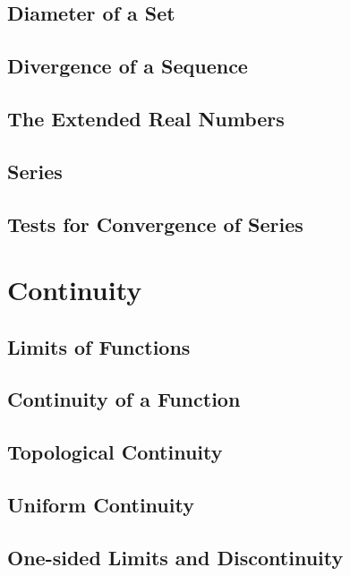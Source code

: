 \documentclass[a4paper, openany]{book}
\begin{document}
\section{Diameter of a Set}

\newpage

\section{Divergence of a Sequence}

\newpage

\section{The Extended Real Numbers}

\newpage

\section{Series}

\newpage

\section{Tests for Convergence of Series}

\newpage

\chapter{Continuity}
\section{Limits of Functions}

\newpage

\section{Continuity of a Function}

\newpage

\section{Topological Continuity}

\newpage

\section{Uniform Continuity}

\newpage

\section{One-sided Limits and Discontinuity}

\newpage
\end{document}
